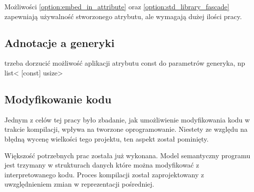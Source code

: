 Możliwości \ref{option:embed_in_attribute} oraz \ref{option:std_library_fascade} zapewniają używalność stworzonego atrybutu, ale wymagają dużej ilości pracy.


\subsection{Adnotacje a generyki}

trzeba dorzucić możliwość aplikacji atrybutu const do parametrów generyka, np list< [const] usize>

\subsection{Modyfikowanie kodu}

Jednym z celów tej pracy było zbadanie, jak umożliwienie modyfikowania kodu w trakcie kompilacji, wpływa na tworzone oprogramowanie.
Niestety ze względu na błędną wycenę wielkości tego projektu, ten aspekt został pominięty.

Większość potrzebnych prac została już wykonana.
Model semantyczny programu jest trzymany w strukturach danych które można modyfikować z interpretowanego kodu.
Proces kompilacji został zaprojektowany z uwzględnieniem zmian w reprezentacji pośredniej.
